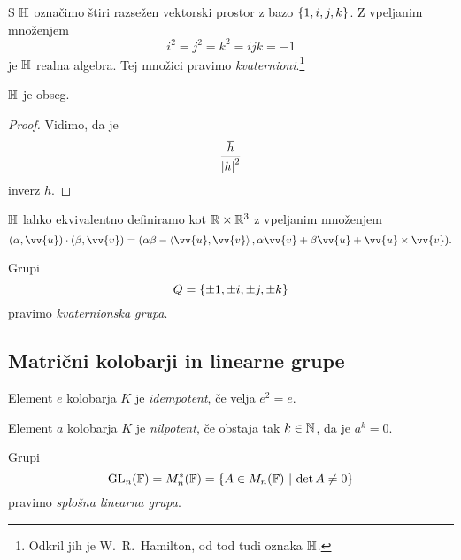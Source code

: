 
\begin{okvir}
\begin{definicija}
S $\mathbb{H}$ označimo štiri razsežen vektorski prostor z bazo
$\left\{1,i,j,k\right\}$. Z vpeljanim množenjem
\[
i^2=j^2=k^2=ijk=-1
\]
je $\mathbb{H}$ realna algebra. Tej množici pravimo
\emph{kvaternioni}.\footnote{Odkril jih je
W.\ R.\ Hamilton, od tod tudi oznaka $\mathbb{H}$.}
\end{definicija}
\end{okvir}

\begin{trditev}
$\mathbb{H}$ je obseg.
\end{trditev}

\begin{proof}
Vidimo, da je
\[
\frac{\overline{h}}{\left\lvert h\right\rvert^2}
\]
inverz $h$.
\end{proof}

\begin{opomba}
$\mathbb{H}$ lahko ekvivalentno definiramo kot $\mathbb{R} \times \mathbb{R}^3$ z vpeljanim
množenjem
\[
(\alpha,\vv{u}) \cdot (\beta, \vv{v}) =
(\alpha \beta - \skl{\vv{u},\vv{v}},
\alpha \vv{v} + \beta \vv{u} + \vv{u} \times \vv{v}).
\]
\end{opomba}

\begin{definicija}
Grupi
\[
Q = \left\{\pm 1, \pm i, \pm j, \pm k\right\}
\]
pravimo \emph{kvaternionska grupa}.
\end{definicija}

\newpage

\subsection{Matrični kolobarji in linearne grupe}

\begin{definicija}
Element $e$ kolobarja $K$ je
\emph{idempotent}, če velja
$e^2 = e$.
\end{definicija}

\begin{definicija}
Element $a$ kolobarja $K$ je \emph{nilpotent}, če obstaja tak
$k \in \mathbb{N}$, da je $a^k = 0$.
\end{definicija}

\begin{definicija}
Grupi
\[
\operatorname{GL}_n(\mathbb{F}) = M_n^*(\mathbb{F}) =
\left\{A \in M_n(\mathbb{F})~\middle\vert~\det A \ne 0\right\}
\]
pravimo
\emph{splošna linearna grupa}.
\end{definicija}

